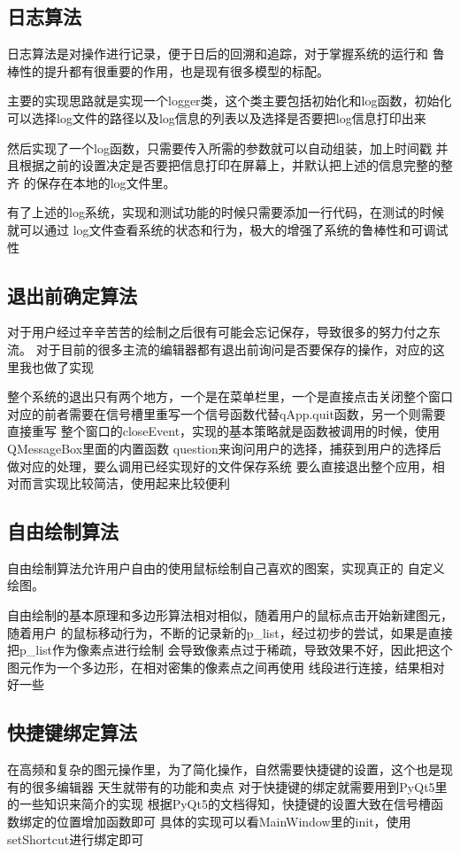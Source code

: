 \documentclass[a4paper,UTF8]{article}
\theoremstyle{definition}
\begin{document}
\subsection{日志算法}
日志算法是对操作进行记录，便于日后的回溯和追踪，对于掌握系统的运行和
鲁棒性的提升都有很重要的作用，也是现有很多模型的标配。

主要的实现思路就是实现一个logger类，这个类主要包括初始化和log函数，初始化
可以选择log文件的路径以及log信息的列表以及选择是否要把log信息打印出来

然后实现了一个log函数，只需要传入所需的参数就可以自动组装，加上时间戳
并且根据之前的设置决定是否要把信息打印在屏幕上，并默认把上述的信息完整的整齐
的保存在本地的log文件里。

有了上述的log系统，实现和测试功能的时候只需要添加一行代码，在测试的时候就可以通过
log文件查看系统的状态和行为，极大的增强了系统的鲁棒性和可调试性
\subsection{退出前确定算法}
对于用户经过辛辛苦苦的绘制之后很有可能会忘记保存，导致很多的努力付之东流。
对于目前的很多主流的编辑器都有退出前询问是否要保存的操作，对应的这里我也做了实现

整个系统的退出只有两个地方，一个是在菜单栏里，一个是直接点击关闭整个窗口
对应的前者需要在信号槽里重写一个信号函数代替qApp.quit函数，另一个则需要直接重写
整个窗口的closeEvent，实现的基本策略就是函数被调用的时候，使用QMessageBox里面的内置函数
question来询问用户的选择，捕获到用户的选择后做对应的处理，要么调用已经实现好的文件保存系统
要么直接退出整个应用，相对而言实现比较简洁，使用起来比较便利

\subsection{自由绘制算法}
自由绘制算法允许用户自由的使用鼠标绘制自己喜欢的图案，实现真正的
自定义绘图。

自由绘制的基本原理和多边形算法相对相似，随着用户的鼠标点击开始新建图元，随着用户
的鼠标移动行为，不断的记录新的p\_list，经过初步的尝试，如果是直接把p\_list作为像素点进行绘制
会导致像素点过于稀疏，导致效果不好，因此把这个图元作为一个多边形，在相对密集的像素点之间再使用
线段进行连接，结果相对好一些

\subsection{快捷键绑定算法}
在高频和复杂的图元操作里，为了简化操作，自然需要快捷键的设置，这个也是现有的很多编辑器
天生就带有的功能和卖点
对于快捷键的绑定就需要用到PyQt5里的一些知识来简介的实现
根据PyQt5的文档得知，快捷键的设置大致在信号槽函数绑定的位置增加函数即可
具体的实现可以看MainWindow里的init，使用setShortcut进行绑定即可
\end{document}
